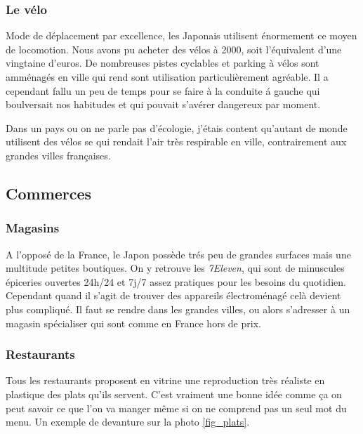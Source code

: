 \documentclass[journal]{RapportFR}
\begin{document}
\begin{CJK*}{UTF8}{min}
\subsubsection{Le v\'elo}

Mode de d\'eplacement par excellence, les Japonais utilisent \'enormement ce moyen de locomotion. Nous avons pu acheter des v\'elos \`a 2000\textyen, soit l'\'equivalent d'une vingtaine d'euros. De nombreuses pistes cyclables et parking \`a v\'elos sont amm\'enag\'es en ville qui rend sont utilisation particuli\`erement agr\'eable. Il a cependant fallu un peu de temps pour se faire \`a la conduite \'a gauche qui boulversait nos habitudes et qui pouvait s'av\'erer dangereux par moment.

Dans un pays ou on ne parle pas d'\'ecologie, j'\'etais content qu'autant de monde utilisent des v\'elos se qui rendait l'air tr\`es respirable en ville, contrairement aux grandes villes fran\c caises.


\subsection{Commerces}

\subsubsection{Magasins}

A l'oppos\'e de la France, le Japon poss\`ede tr\'es peu de grandes surfaces mais une multitude petites boutiques. On y retrouve les \textit{7Eleven}, qui sont de minuscules \'epiceries ouvertes 24h/24 et 7j/7 assez pratiques pour les besoins du quotidien.
Cependant quand il s'agit de trouver des appareils \'electrom\'enag\'e cel\`a devient plus compliqu\'e. Il faut se rendre dans les grandes villes, ou alors s'adresser \`a un magasin sp\'ecialiser qui sont comme en France hors de prix.

\subsubsection{Restaurants}

Tous les restaurants proposent en vitrine une reproduction tr\`es r\'ealiste en plastique des plats qu'ils servent. C'est vraiment une bonne id\'ee comme \c ca on peut savoir ce que l'on va manger m\^eme si on ne comprend pas un seul mot du menu.
Un exemple de devanture sur la photo \ref{fig_plats}.



\end{CJK*}
\end{document}
